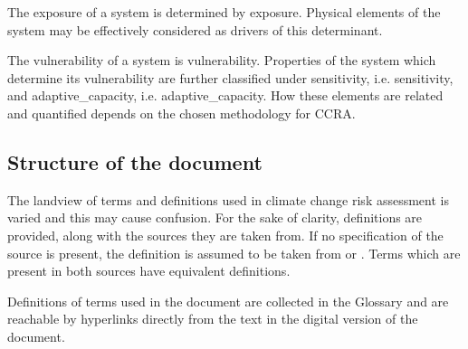 The \gls{exposure} of a system is determined by \glsdesc{exposure}. Physical elements of the system may be effectively considered as \Glspl{driver} of this \gls{determinant}.

The \gls{vulnerability} of a system is \glsdesc{vulnerability}. Properties of the system which determine its \gls{vulnerability} are further classified under \gls{sensitivity}, i.e. \glsdesc{sensitivity}, and \gls{adaptive_capacity}, i.e. \glsdesc{adaptive_capacity}. How these elements are related and quantified depends on the chosen methodology for \gls{CCRA}.



\subsection{Structure of the document}
The landview of terms and definitions used in climate change risk assessment is varied and this may cause confusion. For the sake of clarity, definitions are provided, along with the sources they are taken from.
If no specification of the source is present, the definition is assumed to be taken from \cite{2021ISO14091} or \cite{2021MatthewsAnnexVII}. Terms which are present in both sources have equivalent definitions.

Definitions of terms used in the document are collected in the Glossary and are reachable by hyperlinks directly from the text in the digital version of the document.
